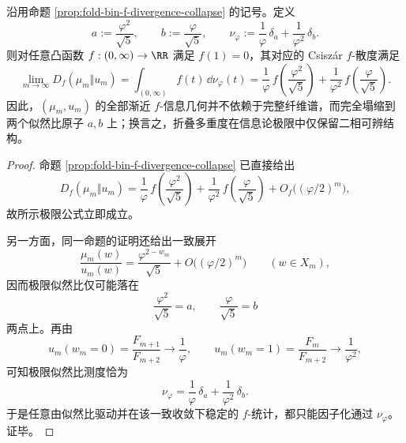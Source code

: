 \begin{theorem}[折叠信息几何的二点塌缩原理]\label{thm:xi-time-part64b-fold-information-geometry-two-point-collapse}
沿用命题 \ref{prop:fold-bin-f-divergence-collapse} 的记号。定义
\[
a:=\frac{\varphi^2}{\sqrt5},
\qquad
b:=\frac{\varphi}{\sqrt5},
\qquad
\nu_\varphi:=\frac1\varphi\,\delta_a+\frac1{\varphi^2}\,\delta_b.
\]
则对任意凸函数 \(f:(0,\infty)\to\RR\) 满足 \(f(1)=0\)，其对应的 Csisz\'ar \(f\)-散度满足
\[
\boxed{\;
\lim_{m\to\infty}D_f(\mu_m\Vert u_m)
=
\int_{(0,\infty)}f(t)\,\dd\nu_\varphi(t)
=
\frac1\varphi\,f\!\left(\frac{\varphi^2}{\sqrt5}\right)
+\frac1{\varphi^2}\,f\!\left(\frac{\varphi}{\sqrt5}\right).\;}
\]
因此，\((\mu_m,u_m)\) 的全部渐近 \(f\)-信息几何并不依赖于完整纤维谱，而完全塌缩到两个似然比原子 \(a,b\) 上；换言之，折叠多重度在信息论极限中仅保留二相可辨结构。
\end{theorem}
\begin{proof}
命题 \ref{prop:fold-bin-f-divergence-collapse} 已直接给出
\[
D_f(\mu_m\Vert u_m)
=
\frac1\varphi\,f\!\left(\frac{\varphi^2}{\sqrt5}\right)
+\frac1{\varphi^2}\,f\!\left(\frac{\varphi}{\sqrt5}\right)
+O_f\bigl((\varphi/2)^m\bigr),
\]
故所示极限公式立即成立。

另一方面，同一命题的证明还给出一致展开
\[
\frac{\mu_m(w)}{u_m(w)}
=
\frac{\varphi^{2-w_m}}{\sqrt5}+O\bigl((\varphi/2)^m\bigr)
\qquad (w\in X_m),
\]
因而极限似然比仅可能落在
\[
\frac{\varphi^2}{\sqrt5}=a,
\qquad
\frac{\varphi}{\sqrt5}=b
\]
两点上。再由
\[
u_m(w_m=0)=\frac{F_{m+1}}{F_{m+2}}\longrightarrow \frac1\varphi,
\qquad
u_m(w_m=1)=\frac{F_m}{F_{m+2}}\longrightarrow \frac1{\varphi^2},
\]
可知极限似然比测度恰为
\[
\nu_\varphi=\frac1\varphi\,\delta_a+\frac1{\varphi^2}\,\delta_b.
\]
于是任意由似然比驱动并在该一致收敛下稳定的 \(f\)-统计，都只能因子化通过 \(\nu_\varphi\)。证毕。
\end{proof}

